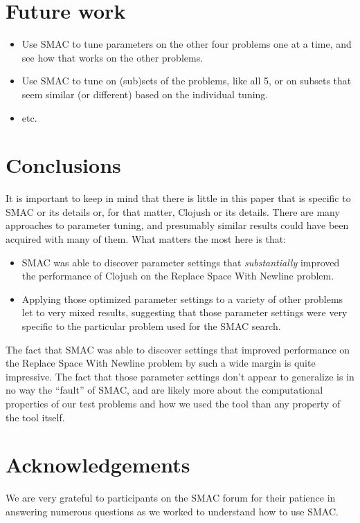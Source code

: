 \section{Future work}
\label{sec:futureWork}

\begin{itemize}
	\item Use SMAC to tune parameters on the other four problems one at a time, and see how that works on the other problems.
	\item Use SMAC to tune on (sub)sets of the problems, like all 5, or on subsets that seem similar (or different) based on the individual tuning.
	\item etc.
\end{itemize}

\section{Conclusions}
\label{sec:conclusion}

It is important to keep in mind that there is little in this paper that is
specific to SMAC or its details or, for that matter, Clojush or its details. 
There are many approaches to parameter
tuning, and presumably similar results could have been acquired with many of
them. What matters the most here is that:
\begin{itemize}
	\item SMAC was able to discover parameter settings that 
	\emph{substantially} improved the performance
	of Clojush on the Replace Space With Newline problem.
	\item Applying those optimized parameter settings to a variety of other
	problems let to very mixed results, suggesting that those parameter
	settings were very specific to the particular problem used for the SMAC
	search.
\end{itemize}
The fact that SMAC was able to discover settings that improved
performance on the Replace Space With Newline problem by such a wide margin
is quite impressive. The fact that those parameter settings don't appear to
generalize is in no way the ``fault'' of SMAC, and are likely more 
about the computational properties of our test problems and how we used 
the tool than any property of the tool itself.


\section*{Acknowledgements}
\label{sec:acknowledgements}

We are very grateful to participants on the SMAC forum for their patience
in answering numerous questions as we worked to understand how to use
SMAC.
